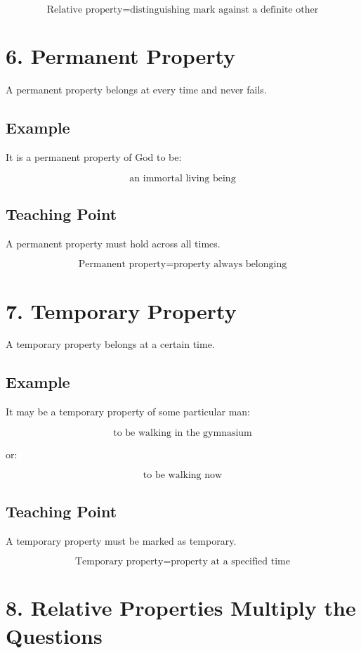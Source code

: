 \documentclass[12pt]{article}
\begin{document}
\[
\boxed{
\text{Relative property} = \text{distinguishing mark against a definite other}
}
\]

\section*{6. Permanent Property}

A permanent property belongs at every time and never fails.

\subsection*{Example}

It is a permanent property of God to be:

\[
\text{an immortal living being}
\]

\subsection*{Teaching Point}

A permanent property must hold across all times.

\[
\boxed{
\text{Permanent property} = \text{property always belonging}
}
\]

\section*{7. Temporary Property}

A temporary property belongs at a certain time.

\subsection*{Example}

It may be a temporary property of some particular man:

\[
\text{to be walking in the gymnasium}
\]

or:

\[
\text{to be walking now}
\]

\subsection*{Teaching Point}

A temporary property must be marked as temporary.

\[
\boxed{
\text{Temporary property} = \text{property at a specified time}
}
\]

\section*{8. Relative Properties Multiply the Questions}
\end{document}
